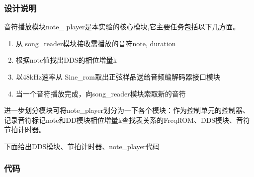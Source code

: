 \documentclass{ctexart}
\begin{document}
        \subsubsection{设计说明}
        音符播放模块note_ player是本实验的核心模块,它主要任务包括以下几方面。
        \begin{enumerate}
            \item 从 song_reader模块接收需播放的音符{note, duration}
            \item 根据note值找出DDS的相位增量k
            \item 以48kHz速率从 Sine_rom取出正弦样品送给音频编解码器接口模块
            \item 当一个音符播放完成，向song_reader模块索取新的音符
        \end{enumerate}
        进一步划分模块可将note_player划分为一下各个模块：作为控制单元的控制器、记录音符标记note和DD模块相位增量k查找表关系的FreqROM、DDS模块、音符节拍计时器。

        下面给出DDS模块、节拍计时器、note_player代码

        \subsubsection{代码}
        

        
\end{document}
